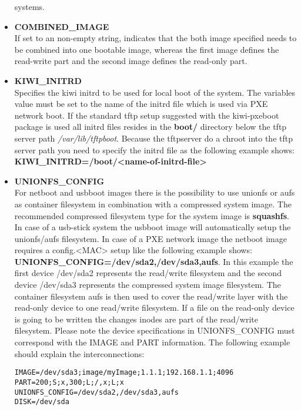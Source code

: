 \begin{itemize}
        systems.
    \item \textbf{COMBINED\_IMAGE}\\
        If set to an non-empty string, indicates that the both
        image specified needs to be combined into one bootable
        image, whereas the first image defines the read-write
        part and the second image defines the read-only part.
    \item \textbf{KIWI\_INITRD}\\
        Specifies the kiwi initrd to be used for local boot of the
        system. The variables value must be set to the name of the
        initrd file which is used via PXE network boot. If the
        standard tftp setup suggested with the kiwi-pxeboot package
        is used all initrd files resides in the \textbf{boot/} directory
        below the tftp server path \textit{/var/lib/tftpboot}. Because
        the tftpserver do a chroot into the tftp server path you need
        to specify the initrd file as the following example shows:
        \textbf{KIWI\_INITRD=/boot/<name-of-initrd-file>}
    \item \textbf{UNIONFS\_CONFIG}\\
        For netboot and usbboot images there is the possibility to
        use unionfs or aufs as container filesystem in combination
        with a compressed system image. The recommended compressed
        filesystem type for the system image is \textbf{squashfs}.
        In case of a usb-stick system the usbboot image will
        automatically setup the unionfs/aufs filesystem. In case of
        a PXE network image the netboot image requires a config.<MAC>
        setup like the following example shows:
        \textbf{UNIONFS\_CONFIG=/dev/sda2,/dev/sda3,aufs}. In this
        example the first device /dev/sda2 represents the read/write
        filesystem and the second device /dev/sda3 represents the
        compressed system image filesystem. The container filesystem
        aufs is then used to cover the read/write layer with the
        read-only device to one read/write filesystem. If a file on
        the read-only device is going to be written the changes inodes
        are part of the read/write filesystem. Please note the device
        specifications in UNIONFS\_CONFIG must correspond with
        the IMAGE and PART information. The following example should
        explain the interconnections:

\begin{verbatim}
IMAGE=/dev/sda3;image/myImage;1.1.1;192.168.1.1;4096
PART=200;S;x,300;L;/,x;L;x
UNIONFS_CONFIG=/dev/sda2,/dev/sda3,aufs
DISK=/dev/sda
\end{verbatim}


\end{itemize}
